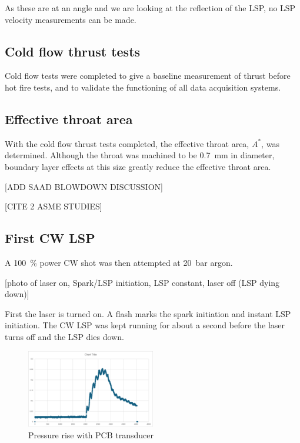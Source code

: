 
            As these are at an angle and we are looking at the reflection of the LSP, no LSP velocity measurements can be made.
        
        \subsection{Cold flow thrust tests}

            Cold flow tests were completed to give a baseline measurement of thrust before hot fire tests, and to validate the functioning of all data acquisition systems.
            

            
        
        \subsection{Effective throat area}
            
            With the cold flow thrust tests completed, the effective throat area, $A^*$, was determined. Although the throat was machined to be \qty{0.7}{mm} in diameter, boundary layer effects at this size greatly reduce the effective throat area.

            [ADD SAAD BLOWDOWN DISCUSSION]

            [CITE 2 ASME STUDIES]


        \subsection{First CW LSP}
            
            A \qty{100}{\%} power CW shot was then attempted at \qty{20}{bar} argon. 

            [photo of laser on, Spark/LSP initiation, LSP constant, laser off (LSP dying down)]

            First the laser is turned on. A flash marks the spark initiation and instant LSP initiation. The CW LSP was kept running for about a second before the laser turns off and the LSP dies down.

            \begin{figure}[!ht]
                \centering
                \includegraphics[width=0.5\textwidth]{assets/4 experiments/CW pressure rise.png}
                \caption{Pressure rise with PCB transducer}
            \end{figure}

